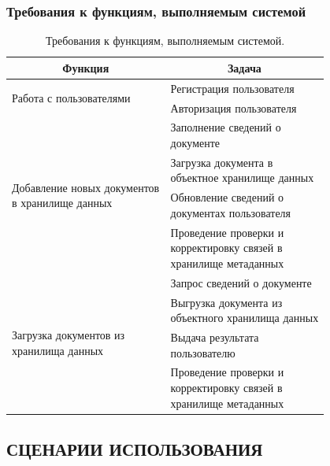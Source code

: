 \documentclass[a4paper,14pt]{extarticle}
\newcommand{\heading}[1]{\multicolumn{1}{|c|}{\textbf{#1}}}
\begin{document}
\subsubsection{Требования к функциям, выполняемым системой}
\begin{table}[h!]
	\caption{\label{tab:functions} Требования к функциям, выполняемым системой.}
	\begin{center}\small
		\begin{tabular}{|m{0.4\linewidth}|m{0.4\linewidth}|}
			\hline
			\heading{Функция} & \heading{Задача}\\
			\hline
			
			\multirow{2}{0.95\linewidth}{Работа с пользователями}
			& Регистрация пользователя \\\cline{2-2}
			& Авторизация пользователя \\\hline

			\multirow{4}{0.95\linewidth}{Добавление новых документов в хранилище данных} 
			& Заполнение сведений о документе \\\cline{2-2}
			& Загрузка документа в объектное хранилище данных \\\cline{2-2}
			& Обновление сведений о документах пользователя \\\cline{2-2}
			& Проведение проверки и корректировку связей в хранилище метаданных \\\hline
			
			\multirow{4}{0.95\linewidth}{Загрузка документов из хранилища данных} 
			& Запрос сведений о документе \\\cline{2-2}
			& Выгрузка документа из объектного хранилища данных \\\cline{2-2}
			& Выдача результата пользователю \\\cline{2-2}
			& Проведение проверки и корректировку связей в хранилище метаданных \\\hline
			
			
		\end{tabular}
	\end{center}
\end{table}
\subsection{СЦЕНАРИИ ИСПОЛЬЗОВАНИЯ}
\end{document}
